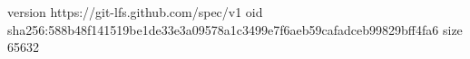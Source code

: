 version https://git-lfs.github.com/spec/v1
oid sha256:588b48f141519be1de33e3a09578a1c3499e7f6aeb59cafadceb99829bff4fa6
size 65632
